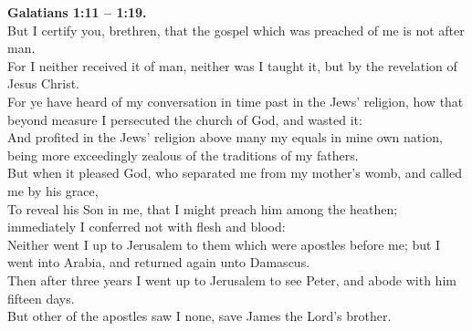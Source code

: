 \documentclass[10pt]{article} %
\begin{document}
{\begin{minipage}[t]{0.45\textwidth}
\textbf{Galatians 1:11 -- 1:19.}\\
But I certify you, brethren, that the gospel which was preached of me is not after man.\\
For I neither received it of man, neither was I taught it, but by the revelation of Jesus Christ.\\
For ye have heard of my conversation in time past in the Jews' religion, how that beyond measure I persecuted the church of God, and wasted it:\\
And profited in the Jews' religion above many my equals in mine own nation, being more exceedingly zealous of the traditions of my fathers.\\
But when it pleased God, who separated me from my mother's womb, and called me by his grace,\\
To reveal his Son in me, that I might preach him among the heathen; immediately I conferred not with flesh and blood:\\
Neither went I up to Jerusalem to them which were apostles before me; but I went into Arabia, and returned again unto Damascus.\\
Then after three years I went up to Jerusalem to see Peter, and abode with him fifteen days.\\
But other of the apostles saw I none, save James the Lord's brother.\\
\end{minipage}}
\newpage\huge
\singlespacing %
\end{document}

